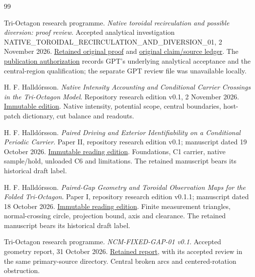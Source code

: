 \begin{thebibliography}{99}\small\raggedright
{} Tri-Octagon research programme.
\emph{Native toroidal recirculation and possible diversion: proof review}.
Accepted analytical investigation NATIVE\_TOROIDAL\_RECIRCULATION\_AND\_DIVERSION\_01, 2 November 2026.
\href{evidence/accepted_proof.md}{Retained original proof} and
\href{evidence/accepted_claim_source_ledger.md}{original claim/source ledger}.
The \href{evidence/publication_authorization.md}{publication authorization} records GPT's underlying analytical acceptance and the central-region qualification; the separate GPT review file was unavailable locally.

 H. F. Halld\'orsson.
\emph{Native Intensity Accounting and Conditional Carrier Crossings in the Tri-Octagon Model}.
Repository research edition v0.1, 2 November 2026.
\href{https://github.com/pzychozen/trioctagon-physics/tree/a05c545644417b10f1328e203d421349f7b20bf6/papers/NATIVE_INTENSITY_AND_CONDITIONAL_CARRIER_CROSSINGS/publication/v0.1}{Immutable edition}.
Native intensity, potential scope, central boundaries, host-patch dictionary, cut balance and readouts.

 H. F. Halld\'orsson.
\emph{Paired Driving and Exterior Identifiability on a Conditional Periodic Carrier}.
Paper II, repository research edition v0.1; manuscript dated 19 October 2026.
\href{https://github.com/pzychozen/trioctagon-physics/tree/c881b682ef6a8128dd1dc316d1850b9aeb1e1c8b/SRG_REDISCOVERY/PAPERS/PAIRED_DRIVING_EXTERIOR_IDENTIFIABILITY/publication/v0.1}{Immutable reading edition}.
Foundations, C1 carrier, native sample/hold, unloaded C6 and limitations. The retained manuscript bears its historical draft label.

 H. F. Halld\'orsson.
\emph{Paired-Gap Geometry and Toroidal Observation Maps for the Folded Tri-Octagon}.
Paper I, repository research edition v0.1.1; manuscript dated 18 October 2026.
\href{https://github.com/pzychozen/trioctagon-physics/tree/c881b682ef6a8128dd1dc316d1850b9aeb1e1c8b/SRG_REDISCOVERY/PAPERS/PAIRED_GAP_GEOMETRY_OBSERVATION/publication/v0.1.1}{Immutable reading edition}.
Finite measurement triangles, normal-crossing circle, projection bound, axis and clearance. The retained manuscript bears its historical draft label.

 Tri-Octagon research programme.
\emph{NCM-FIXED-GAP-01 v0.1}. Accepted geometry report, 31 October 2026.
\href{https://github.com/pzychozen/trioctagon-physics/blob/c881b682ef6a8128dd1dc316d1850b9aeb1e1c8b/papers/PHASE_RECONSTRUCTION_AND_STATIONARY_SUPPORT_AXES/publication/v0.1/provenance/primary/fixed_gap_report.md}{Retained report}, with its accepted review in the same primary-source directory.
Central broken arcs and centered-rotation obstruction.


\end{thebibliography}
